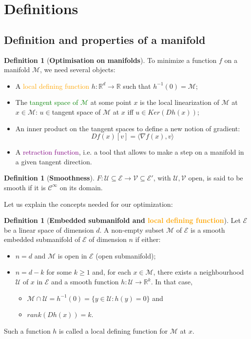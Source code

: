 \documentclass[12pt, openany]{report}
\newcommand{\R}{\mathbb{R}}
\newcommand{\M}{\mathcal{M}}
\theoremstyle{definition}
\newtheorem{definition}[thm]{Definition}
\begin{document}
\section{Definitions}
\subsection{Definition and properties of a manifold}
\begin{definition}[\textbf{Optimisation on manifolds}] 
	To minimize a function $f$ on a manifold $\M$, we need several objects:
	\begin{itemize}
		\item A \textcolor{orange}{local defining function} $h:\R^d\to \R$ such that $h^{-1}(0) = \M$;
		\item The \textcolor{green}{tangent space of $\M$} at some point $x$ is the local linearization of $\M$ at $x\in \M$: $u\in $tangent space of $\M$ at $x$ iff $u\in Ker(Dh(x))$;
		\item An inner product on the tangent spaces to define a new notion of gradient: \[Df(x)[v] = \langle \nabla f(x), v\rangle\]
		\item A \textcolor{purple}{retraction function}, i.e. a tool that allows to make a step on a manifold in a given tangent direction. 
	\end{itemize}
\end{definition}
\begin{definition}[\textbf{Smoothness}]
	$F:\mathcal{U}\subseteq \mathcal{E}\to \mathcal{V}\subseteq \mathcal{E}'$, with $\mathcal{U}, \mathcal{V}$ open, is said to be smooth if it is $\mathcal{C}^{\infty}$ on its domain.
\end{definition}
Let us explain the concepts needed for our optimization: 
\begin{definition}[\textbf{Embedded submanifold and \textcolor{orange}{local defining function}}]
	Let $\mathcal{E}$ be a linear space of dimension $d$. A non-empty subset $\M$ of $\mathcal{E}$ is a smooth embedded submanifold of $\mathcal{E}$ of dimension $n$ if either:
	\begin{itemize}
		\item $n=d$ and $\M$ is open in $\mathcal{E}$ (open submanifold);
		\item $n=d-k$ for some $k\ge 1$ and, for each $x\in \M$, there exists a neighbourhood $\mathcal{U}$ of $x$ in $\mathcal{E}$ and a smooth function $h:\mathcal{U}\to \R^k$. In that case, 
		\begin{itemize}
			\item $\M\cap \mathcal{U}=h^{-1}(0) = \{y\in \mathcal{U}:h(y)=0\}$ and 
			\item $rank(Dh(x)) = k$.
		\end{itemize}
	\end{itemize}
	Such a function $h$ is called a local defining function for $\M$ at $x$.
\end{definition}
\end{document}
